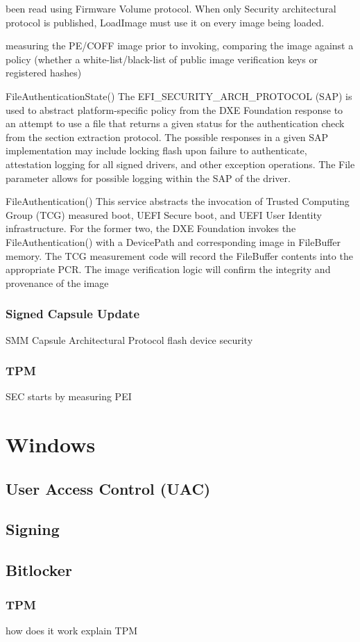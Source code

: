 been read using Firmware Volume protocol.
When only Security architectural protocol is published, LoadImage must use it on every image
being loaded.

measuring the PE/COFF image prior to invoking, comparing the
image against a policy (whether a white-list/black-list of public image verification keys or registered
hashes)

FileAuthenticationState()
The EFI_SECURITY_ARCH_PROTOCOL (SAP) is used to abstract platform-specific policy from
the DXE Foundation response to an attempt to use a file that returns a given status for the
authentication check from the section extraction protocol.
The possible responses in a given SAP implementation may include locking flash upon failure to
authenticate, attestation logging for all signed drivers, and other exception operations. The File
parameter allows for possible logging within the SAP of the driver.

FileAuthentication()
This service abstracts the invocation of Trusted Computing Group (TCG) measured boot, UEFI
Secure boot, and UEFI User Identity infrastructure. For the former two, the DXE Foundation
invokes the FileAuthentication() with a DevicePath and corresponding image in
FileBuffer memory. The TCG measurement code will record the FileBuffer contents into the
appropriate PCR. The image verification logic will confirm the integrity and provenance of the
image

\subsubsection{Signed Capsule Update}
SMM
Capsule Architectural Protocol
flash device security
\subsubsection{TPM}
SEC starts by measuring PEI

\section{Windows}
\subsection{User Access Control (UAC)}
\subsection{Signing}
\subsection{Bitlocker}
\subsubsection{TPM}
how does it work
explain TPM